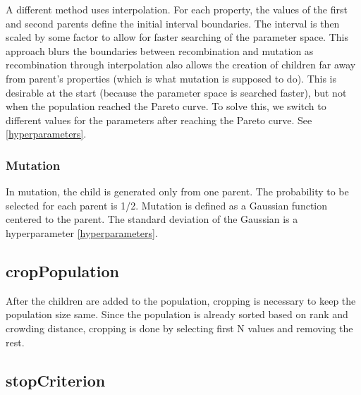 A different method uses interpolation. For each property, the values of the first and second parents define the initial interval boundaries. The interval is then scaled by some factor to allow for faster searching of the parameter space. 
This approach blurs the boundaries between recombination and mutation as recombination through interpolation also allows the creation of children far away from parent's properties (which is what mutation is supposed to do). This is desirable at the start (because the parameter space is searched faster), but not when the population reached the Pareto curve. To solve this, we switch to different values for the parameters after reaching the Pareto curve. See \cref{hyperparameters}.

\subsubsection{Mutation}

In mutation, the child is generated only from one parent. The probability to be selected for each parent is 1/2. Mutation is defined as a Gaussian function centered to the parent. The standard deviation of the Gaussian is a hyperparameter \cref{hyperparameters}.\\

\subsection{cropPopulation} \label{cropPopulation}

After the children are added to the population, cropping is necessary to keep the population size same. Since the population is already sorted based on rank and crowding distance, cropping is done by selecting first N values and removing the rest. 

\subsection{stopCriterion} \label{stopCriterion}

